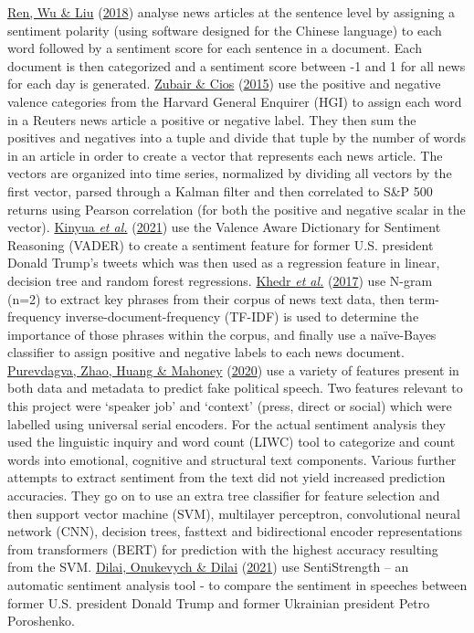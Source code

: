 \documentclass[11pt,preprint, authoryear]{elsarticle}
\numberwithin{equation}{section}
\numberwithin{figure}{section}
\numberwithin{table}{section}
\begin{document}
\protect\hyperlink{ref-ren2018forecasting}{Ren, Wu \& Liu}
(\protect\hyperlink{ref-ren2018forecasting}{2018}) analyse news articles
at the sentence level by assigning a sentiment polarity (using software
designed for the Chinese language) to each word followed by a sentiment
score for each sentence in a document. Each document is then categorized
and a sentiment score between -1 and 1 for all news for each day is
generated. \protect\hyperlink{ref-zubair2015extracting}{Zubair \& Cios}
(\protect\hyperlink{ref-zubair2015extracting}{2015}) use the positive
and negative valence categories from the Harvard General Enquirer (HGI)
to assign each word in a Reuters news article a positive or negative
label. They then sum the positives and negatives into a tuple and divide
that tuple by the number of words in an article in order to create a
vector that represents each news article. The vectors are organized into
time series, normalized by dividing all vectors by the first vector,
parsed through a Kalman filter and then correlated to S\&P 500 returns
using Pearson correlation (for both the positive and negative scalar in
the vector). \protect\hyperlink{ref-kinyua2021analysis}{Kinyua \emph{et
al.}} (\protect\hyperlink{ref-kinyua2021analysis}{2021}) use the Valence
Aware Dictionary for Sentiment Reasoning (VADER) to create a sentiment
feature for former U.S. president Donald Trump's tweets which was then
used as a regression feature in linear, decision tree and random forest
regressions. \protect\hyperlink{ref-khedr2017predicting}{Khedr \emph{et
al.}} (\protect\hyperlink{ref-khedr2017predicting}{2017}) use N-gram
(n=2) to extract key phrases from their corpus of news text data, then
term-frequency inverse-document-frequency (TF-IDF) is used to determine
the importance of those phrases within the corpus, and finally use a
naïve-Bayes classifier to assign positive and negative labels to each
news document. \protect\hyperlink{ref-purevdagva2020machine}{Purevdagva,
Zhao, Huang \& Mahoney}
(\protect\hyperlink{ref-purevdagva2020machine}{2020}) use a variety of
features present in both data and metadata to predict fake political
speech. Two features relevant to this project were `speaker job' and
`context' (press, direct or social) which were labelled using universal
serial encoders. For the actual sentiment analysis they used the
linguistic inquiry and word count (LIWC) tool to categorize and count
words into emotional, cognitive and structural text components. Various
further attempts to extract sentiment from the text did not yield
increased prediction accuracies. They go on to use an extra tree
classifier for feature selection and then support vector machine (SVM),
multilayer perceptron, convolutional neural network (CNN), decision
trees, fasttext and bidirectional encoder representations from
transformers (BERT) for prediction with the highest accuracy resulting
from the SVM. \protect\hyperlink{ref-dilaisentiment}{Dilai, Onukevych \&
Dilai} (\protect\hyperlink{ref-dilaisentiment}{2021}) use SentiStrength
-- an automatic sentiment analysis tool - to compare the sentiment in
speeches between former U.S. president Donald Trump and former Ukrainian
president Petro Poroshenko.
\end{document}
